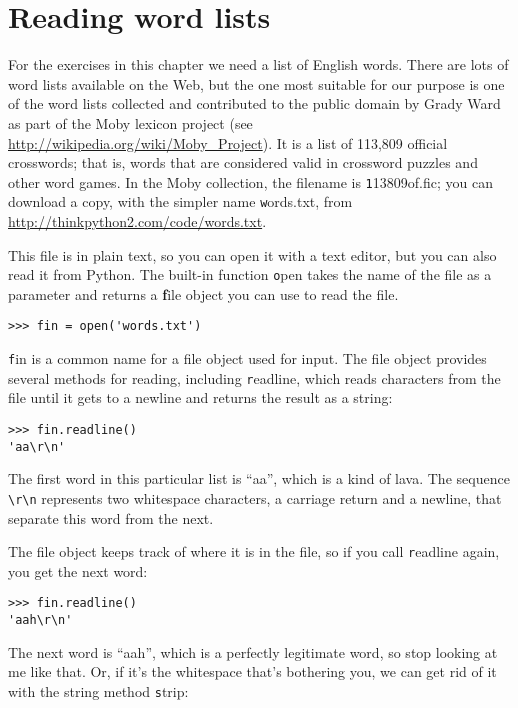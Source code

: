 \documentclass[
DIV=11,
fontsize=12,
twoside,
headinclude=false,
titlepage=firstiscover,
abstract=true,
headsepline=true,
footsepline=true,
chapterprefix=true, %
headings=big,
bibliography=totoc,%
captions=tableheading
]{scrbook}
\theoremstyle{definition}
\begin{document}
\section{Reading word lists}
\label{wordlist}

For the exercises in this chapter we need a list of English words.
There are lots of word lists available on the Web, but the one most
suitable for our purpose is one of the word lists collected and
contributed to the public domain by Grady Ward as part of the Moby
lexicon project (see \url{http://wikipedia.org/wiki/Moby_Project}).  It
is a list of 113,809 official crosswords; that is, words that are
considered valid in crossword puzzles and other word games.  In the
Moby collection, the filename is {\texttt 113809of.fic}; you can download
a copy, with the simpler name {\texttt words.txt}, from
\url{http://thinkpython2.com/code/words.txt}.

This file is in plain text, so you can open it with a text
editor, but you can also read it from Python.  The built-in
function {\texttt open} takes the name of the file as a parameter
and returns a {\textbf file object} you can use to read the file.

\begin{lstlisting}
>>> fin = open('words.txt')
\end{lstlisting}
%
{\texttt fin} is a common name for a file object used for input.  The file
object provides several methods for reading, including {\texttt readline},
which reads characters from the file until it gets to a newline and
returns the result as a string: 

\begin{lstlisting}
>>> fin.readline()
'aa\r\n'
\end{lstlisting}
%
The first word in this particular list is ``aa'', which is a kind of
lava.  The sequence \verb"\r\n" represents two whitespace characters,
a carriage return and a newline, that separate this word from the
next.

The file object keeps track of where it is in the file, so
if you call {\texttt readline} again, you get the next word:

\begin{lstlisting}
>>> fin.readline()
'aah\r\n'
\end{lstlisting}
%
The next word is ``aah'', which is a perfectly legitimate
word, so stop looking at me like that.
Or, if it's the whitespace that's bothering you,
we can get rid of it with the string method {\texttt strip}:
\end{document}
